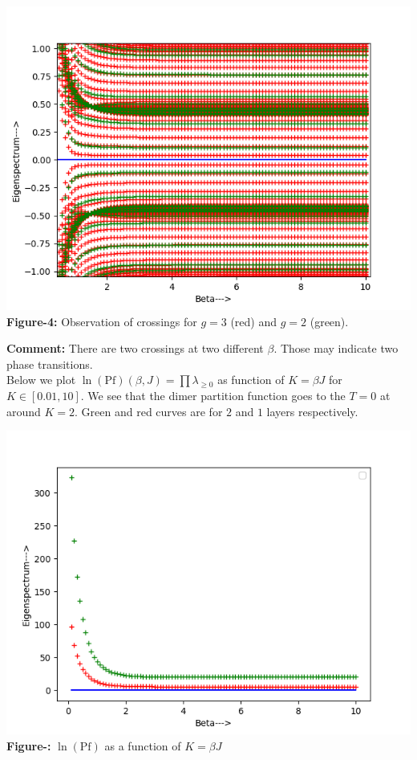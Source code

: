 \documentclass{article}
\begin{document}
     \begin{center}
     	\includegraphics[scale=0.5]{Crossing 2.png}\\
     	\textbf{Figure-4:} Observation of crossings for $g=3$ (red) and $g=2$ (green).\\
     \end{center}
     \vspace{0.2 cm}
     \textbf{Comment:} There are two crossings at two different $\beta$. Those may indicate two phase transitions.\\
     
     Below we plot $\ln (\text{Pf})(\beta, J)=\prod \lambda_{\geq 0}$ as function of $K=\beta J$ for $K \in [0.01,10]$. We see that the dimer partition function goes to the $T=0$ at around $K=2$. Green and red curves are for $2$ and $1$ layers respectively.\\
     \begin{center}
     	\includegraphics[scale=0.5]{Log Pfaffian.png}\\
     	\textbf{Figure-:} $\ln(\text{Pf})$ as a function of $K=\beta J$\\
     \end{center}
\end{document}
